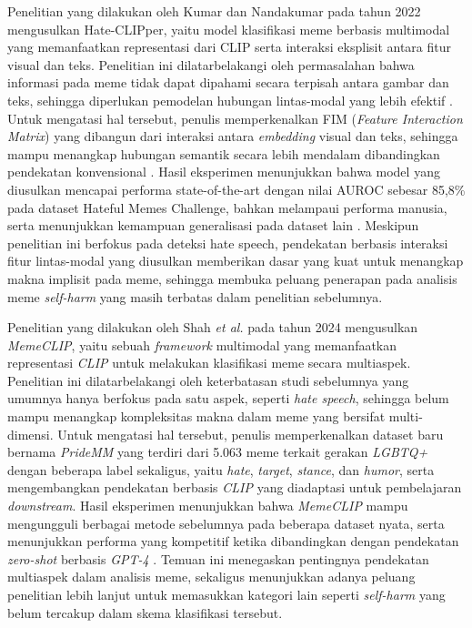Penelitian yang dilakukan oleh Kumar dan Nandakumar pada tahun 2022 mengusulkan Hate-CLIPper, yaitu model klasifikasi meme berbasis multimodal yang memanfaatkan representasi dari CLIP serta interaksi eksplisit antara fitur visual dan teks. Penelitian ini dilatarbelakangi oleh permasalahan bahwa informasi pada meme tidak dapat dipahami secara terpisah antara gambar dan teks, sehingga diperlukan pemodelan hubungan lintas-modal yang lebih efektif . Untuk mengatasi hal tersebut, penulis memperkenalkan FIM (\textit{Feature Interaction Matrix}) yang dibangun dari interaksi antara \textit{embedding}  visual dan teks, sehingga mampu menangkap hubungan semantik secara lebih mendalam dibandingkan pendekatan konvensional . Hasil eksperimen menunjukkan bahwa model yang diusulkan mencapai performa state-of-the-art dengan nilai AUROC sebesar 85{,}8\% pada dataset Hateful Memes Challenge, bahkan melampaui performa manusia, serta menunjukkan kemampuan generalisasi pada dataset lain \cite{kumar2022hateclipper}. Meskipun penelitian ini berfokus pada deteksi hate speech, pendekatan berbasis interaksi fitur lintas-modal yang diusulkan memberikan dasar yang kuat untuk menangkap makna implisit pada meme, sehingga membuka peluang penerapan pada analisis meme \textit{self-harm} yang masih terbatas dalam penelitian sebelumnya.

Penelitian yang dilakukan oleh Shah \textit{et al.} pada tahun 2024 mengusulkan \textit{MemeCLIP}, yaitu sebuah \textit{framework} multimodal yang memanfaatkan representasi \textit{CLIP} untuk melakukan klasifikasi meme secara multiaspek. Penelitian ini dilatarbelakangi oleh keterbatasan studi sebelumnya yang umumnya hanya berfokus pada satu aspek, seperti \textit{hate speech}, sehingga belum mampu menangkap kompleksitas makna dalam meme yang bersifat multi-dimensi. Untuk mengatasi hal tersebut, penulis memperkenalkan dataset baru bernama \textit{PrideMM} yang terdiri dari 5.063 meme terkait gerakan \textit{LGBTQ+} dengan beberapa label sekaligus, yaitu \textit{hate}, \textit{target}, \textit{stance}, dan \textit{humor}, serta mengembangkan pendekatan berbasis \textit{CLIP} yang diadaptasi untuk pembelajaran \textit{downstream}. Hasil eksperimen menunjukkan bahwa \textit{MemeCLIP} mampu mengungguli berbagai metode sebelumnya pada beberapa dataset nyata, serta menunjukkan performa yang kompetitif ketika dibandingkan dengan pendekatan \textit{zero-shot} berbasis \textit{GPT-4} \cite{shah2024memeclip}. Temuan ini menegaskan pentingnya pendekatan multiaspek dalam analisis meme, sekaligus menunjukkan adanya peluang penelitian lebih lanjut untuk memasukkan kategori lain seperti \textit{self-harm} yang belum tercakup dalam skema klasifikasi tersebut.


